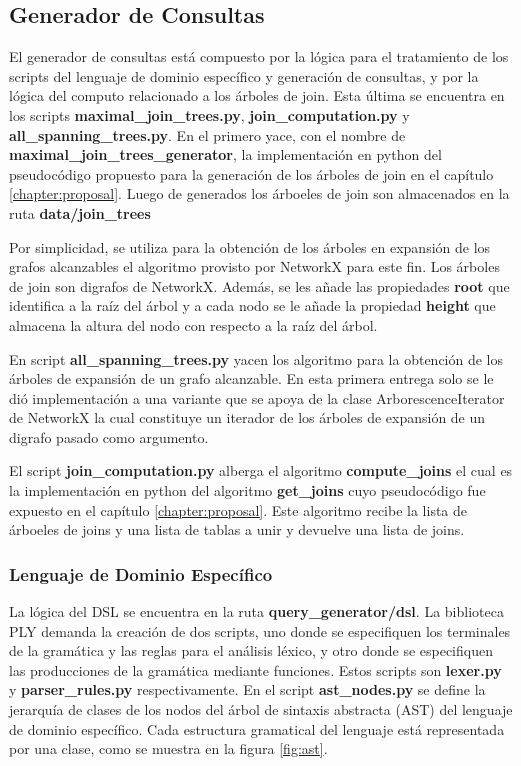 \subsection{Generador de Consultas}

El generador de consultas est\'a compuesto por la l\'ogica para el tratamiento de los scripts del lenguaje de 
dominio espec\'ifico y generaci\'on de consultas, y por la l\'ogica del computo relacionado a los \'arboles de join. 
Esta \'ultima se encuentra en los scripts \textbf{maximal\_join\_trees.py}, \textbf{join\_computation.py} y 
\textbf{all\_spanning\_trees.py}. En el primero yace, con el nombre de \textbf{maximal\_join\_trees\_generator}, 
la implementaci\'on en python del pseudoc\'odigo propuesto para la generaci\'on de los \'arboles de join en el 
cap\'itulo \ref{chapter:proposal}. Luego de generados los \'arboeles de join son almacenados en la ruta 
\textbf{data/join\_trees}

Por simplicidad, se utiliza para la obtenci\'on de los \'arboles en expansi\'on de los grafos alcanzables el algoritmo 
provisto por NetworkX para este fin. Los \'arboles de join son digrafos de NetworkX. Adem\'as, se les añade las propiedades 
\textbf{root} que identifica a la ra\'iz del \'arbol y a cada nodo se le añade la propiedad \textbf{height} que almacena 
la altura del nodo con respecto a la ra\'iz del \'arbol.

En script \textbf{all\_spanning\_trees.py} yacen los algoritmo para la obtenci\'on de los \'arboles de expansi\'on 
de un grafo alcanzable. En esta primera entrega solo se le di\'o implementaci\'on a una variante que se apoya de la 
clase ArborescenceIterator de NetworkX la cual constituye un iterador de los \'arboles de expansi\'on de un digrafo 
pasado como argumento.

El script \textbf{join\_computation.py} alberga el algoritmo \textbf{compute\_joins} el cual es la implementaci\'on 
en python del algoritmo \textbf{get\_joins} cuyo pseudoc\'odigo fue expuesto en el cap\'itulo \ref{chapter:proposal}. 
Este algoritmo recibe la lista de \'arboeles de joins y una lista de tablas a unir y devuelve una lista de joins.

\subsubsection{Lenguaje de Dominio Espec\'ifico}

La l\'ogica del DSL se encuentra en la ruta \textbf{query\_generator/dsl}. La biblioteca 
PLY demanda la creaci\'on de dos scripts, uno donde se especifiquen los terminales de la gram\'atica y las reglas 
para el an\'alisis l\'exico, y otro donde se especifiquen las producciones de la gram\'atica mediante funciones. Estos 
scripts son \textbf{lexer.py} y \textbf{parser\_rules.py} respectivamente. En el script \textbf{ast\_nodes.py} se define  
la jerarqu\'ia de clases de los nodos del \'arbol de sintaxis abstracta (AST) del lenguaje de dominio espec\'ifico. Cada 
estructura gramatical del lenguaje est\'a representada por una clase, como se muestra en la figura \ref{fig:ast}.

